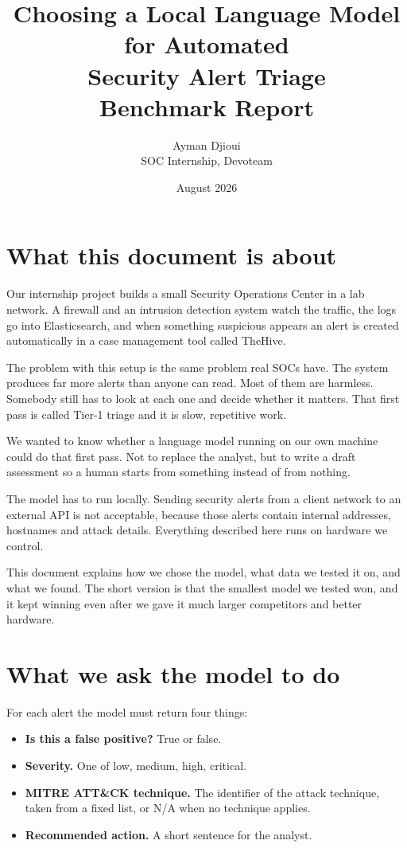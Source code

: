 \documentclass[11pt,a4paper]{article}
\title{\textbf{Choosing a Local Language Model for Automated\\ Security Alert Triage}\\[0.4em]
\large Benchmark Report}
\author{Ayman Djioui \\ \small SOC Internship, Devoteam}
\date{August 2026}
\begin{document}
\maketitle

\section{What this document is about}

Our internship project builds a small Security Operations Center in a lab network.
A firewall and an intrusion detection system watch the traffic, the logs go into
Elasticsearch, and when something suspicious appears an alert is created
automatically in a case management tool called TheHive.

The problem with this setup is the same problem real SOCs have. The system produces
far more alerts than anyone can read. Most of them are harmless. Somebody still has
to look at each one and decide whether it matters. That first pass is called Tier-1
triage and it is slow, repetitive work.

We wanted to know whether a language model running on our own machine could do that
first pass. Not to replace the analyst, but to write a draft assessment so a human
starts from something instead of from nothing.

The model has to run locally. Sending security alerts from a client network to an
external API is not acceptable, because those alerts contain internal addresses,
hostnames and attack details. Everything described here runs on hardware we control.

This document explains how we chose the model, what data we tested it on, and what
we found. The short version is that the smallest model we tested won, and it kept
winning even after we gave it much larger competitors and better hardware.

\section{What we ask the model to do}

For each alert the model must return four things:

\begin{itemize}[nosep]
  \item \textbf{Is this a false positive?} True or false.
  \item \textbf{Severity.} One of low, medium, high, critical.
  \item \textbf{MITRE ATT\&CK technique.} The identifier of the attack technique,
        taken from a fixed list, or N/A when no technique applies.
  \item \textbf{Recommended action.} A short sentence for the analyst.
\end{itemize}
\end{document}
